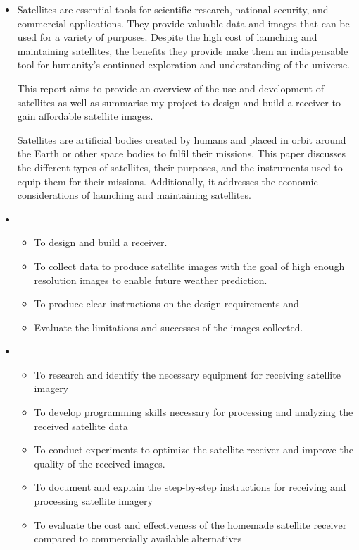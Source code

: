 \documentclass{article}
\begin{document}
    \begin{itemize}
        \item[] Satellites are essential tools for scientific research, national security, and commercial applications. They provide valuable data and images that can be used for a variety of purposes. Despite the high cost of launching and maintaining satellites, the benefits they provide make them an indispensable tool for humanity's continued exploration and understanding of the universe.

        This report aims to provide an overview of the use and development of satellites as well as summarise my project to design and build a receiver to gain affordable satellite images. 

        Satellites are artificial bodies created by humans and placed in orbit around the Earth or other space bodies to fulfil their missions. This paper discusses the different types of satellites, their purposes, and the instruments used to equip them for their missions. Additionally, it addresses the economic considerations of launching and maintaining satellites.

        \item[] 
            \begin{itemize}
                \item To design and build a receiver.
                \item To collect data to produce satellite images with the goal of high enough resolution images to enable future weather prediction. 
                \item To produce clear instructions on the design requirements and
                \item Evaluate the limitations and successes of the images collected. 
            \end{itemize}
        \item[] 
            \begin{itemize}
                \item To research and identify the necessary equipment for receiving satellite imagery
                \item To develop programming skills necessary for processing and analyzing the received satellite data
                \item To conduct experiments to optimize the satellite receiver and improve the quality of the received images.
                \item To document and explain the step-by-step instructions for receiving and processing satellite imagery
                \item To evaluate the cost and effectiveness of the homemade satellite receiver compared to commercially available alternatives
    
            \end{itemize}
    \end{itemize}
\end{document}
